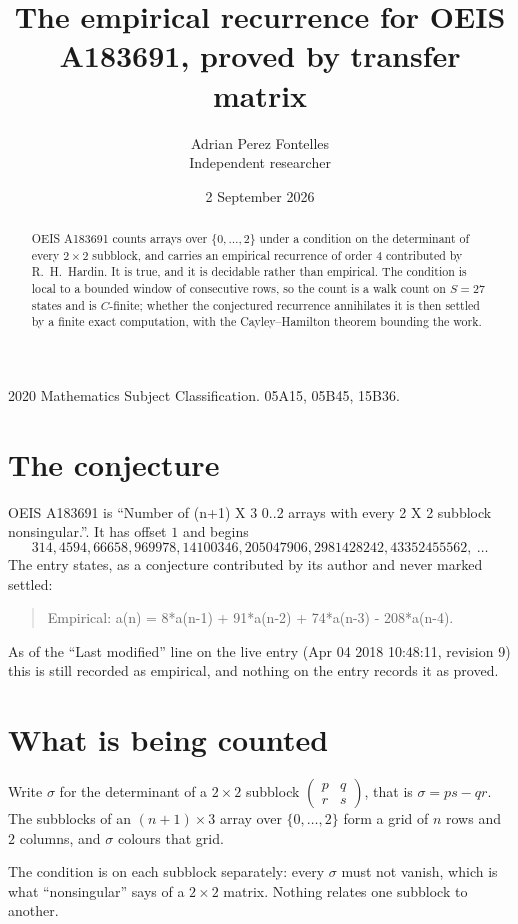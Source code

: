 \documentclass[11pt,a4paper]{article}
\title{The empirical recurrence for OEIS A183691, proved by transfer matrix}
\author{Adrian Perez Fontelles\\ \small Independent researcher}
\date{2 September 2026}
\theoremstyle{plain}
\theoremstyle{definition}
\begin{document}
\maketitle

\begin{abstract}
OEIS A183691 counts arrays over $\{0,\dots,2\}$ under a condition on the determinant of every
$2\times2$ subblock, and carries an empirical recurrence of order $4$ contributed by
R.~H.~Hardin. It is true, and it is decidable rather than empirical. The condition is local to
a bounded window of consecutive rows, so the count is a walk count on $S=27$ states and is
$C$-finite; whether the conjectured recurrence annihilates it is then settled by a finite exact
computation, with the Cayley--Hamilton theorem bounding the work.
\end{abstract}

\noindent\small 2020 Mathematics Subject Classification. 05A15, 05B45, 15B36.\normalsize

\section{The conjecture}

OEIS A183691 is ``Number of (n+1) X 3 0..2 arrays with every 2 X 2 subblock nonsingular.''. It has offset $1$ and begins
\[
314, 4594, 66658, 969978, 14100346, 205047906, 2981428242, 43352455562,\ \dots
\]
The entry states, as a conjecture contributed by its author and never marked settled:
\begin{quote}
Empirical: a(n) = 8*a(n-1) + 91*a(n-2) + 74*a(n-3) - 208*a(n-4).
\end{quote}
As of the ``Last modified'' line on the live entry (Apr 04 2018 10:48:11, revision 9) this is still
recorded as empirical, and nothing on the entry records it as proved.

\section{What is being counted}

Write $\sigma$ for the determinant of a $2\times2$ subblock
$\begin{pmatrix}p&q\\r&s\end{pmatrix}$, that is $\sigma=ps-qr$. The subblocks of an
$(n+1)\times3$ array over $\{0,\dots,2\}$ form a grid of $n$ rows and $2$
columns, and $\sigma$ colours that grid.

The condition is on each subblock separately: every $\sigma$ must not vanish, which is what
``nonsingular'' says of a $2\times2$ matrix. Nothing
relates one subblock to another.
\end{document}
